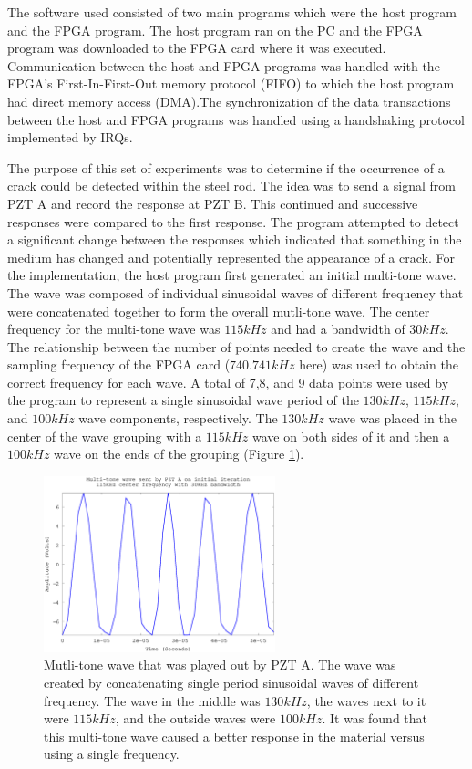 The software used consisted of two main programs which were the host program and the FPGA program. The host program ran on the PC and the FPGA program was downloaded to the FPGA card where it was executed. Communication between the host and FPGA programs was handled with the FPGA's First-In-First-Out memory protocol (FIFO) to which the host program had direct memory access (DMA).The synchronization of the data transactions between the host and FPGA programs was handled using a handshaking protocol implemented by IRQs. 

The purpose of this set of experiments was to determine if the occurrence of a crack could be detected within the steel rod. The idea was to send a signal from PZT A and record the response at PZT B. This continued and successive responses were compared to the first response. The program attempted to detect a significant change between the responses which indicated that something in the medium has changed and potentially represented the appearance of a crack. For the implementation, the host program first generated an initial multi-tone wave. The wave was composed of individual sinusoidal waves of different frequency that were concatenated together to form the overall mutli-tone wave. The center frequency for the multi-tone wave was $115 kHz$ and had a bandwidth of $30 kHz$. The relationship between the number of points needed to create the wave and the sampling frequency of the FPGA card ($740.741 kHz$ here) was used to obtain the correct frequency for each wave. A total of 7,8, and 9 data points were used by the program to represent a single sinusoidal wave period of the $130 kHz$, $115 kHz$, and $100 kHz$ wave components, respectively. The $130 kHz$ wave was placed in the center of the wave grouping with a $115 kHz$ wave on both sides of it and then a $100 kHz$ wave on the ends of the grouping (Figure \ref{fig:initialWave}). 

\begin{figure}[ht!]
\centering
\includegraphics[width=0.6\textwidth]{eps_pics/initialWave}
\caption{Mutli-tone wave that was played out by PZT A. The wave was created by concatenating single period sinusoidal waves of different frequency. The wave in the middle was $130 kHz$, the waves next to it were $115 kHz$, and the outside waves were $100 kHz$. It was found that this multi-tone wave caused a better response in the material versus using a single frequency.
 	 \label{fig:initialWave}} 
\end{figure}

